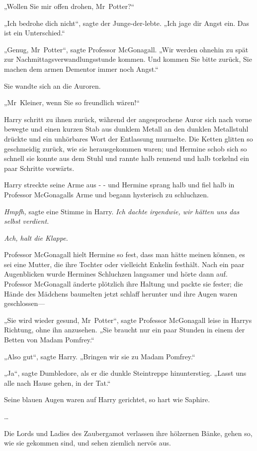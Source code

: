 {„Wollen Sie mir offen drohen, Mr~Potter?“

„Ich bedrohe dich nicht“, sagte der Junge-der-lebte. „Ich jage dir Angst ein. Das ist ein Unterschied.“

„Genug, Mr~Potter“, sagte Professor McGonagall. „Wir werden ohnehin zu spät zur Nachmittagsverwandlungsstunde kommen. Und kommen Sie bitte zurück, Sie machen dem armen Dementor immer noch Angst.“

Sie wandte sich an die Auroren.

„Mr~Kleiner, wenn Sie so freundlich wären!“

Harry schritt zu ihnen zurück, während der angesprochene Auror sich nach vorne bewegte und einen kurzen Stab aus dunklem Metall an den dunklen Metallstuhl drückte und ein unhörbares Wort der Entlassung murmelte. Die Ketten glitten so geschmeidig zurück, wie sie herausgekommen waren; und Hermine schob sich so schnell sie konnte aus dem Stuhl und rannte halb rennend und halb torkelnd ein paar Schritte vorwärts.

Harry streckte seine Arme aus - - und Hermine sprang halb und fiel halb in Professor McGonagalls Arme und begann hysterisch zu schluchzen.

\emph{Hmpfh,} sagte eine Stimme in Harry. \emph{Ich dachte irgendwie, wir hätten uns das selbst verdient.}

\emph{Ach, halt die Klappe.}

Professor McGonagall hielt Hermine so fest, dass man hätte meinen können, es sei eine Mutter, die ihre Tochter oder vielleicht Enkelin festhält. Nach ein paar Augenblicken wurde Hermines Schluchzen langsamer und hörte dann auf. Professor McGonagall änderte plötzlich ihre Haltung und packte sie fester; die Hände des Mädchens baumelten jetzt schlaff herunter und ihre Augen waren geschlossen—

„Sie wird wieder gesund, Mr~Potter“, sagte Professor McGonagall leise in Harrys Richtung, ohne ihn anzusehen. „Sie braucht nur ein paar Stunden in einem der Betten von Madam Pomfrey.“

„Also gut“, sagte Harry. „Bringen wir sie zu Madam Pomfrey.“

„Ja“, sagte Dumbledore, als er die dunkle Steintreppe hinunterstieg. „Lasst uns alle nach Hause gehen, in der Tat.“

Seine blauen Augen waren auf Harry gerichtet, so hart wie Saphire.

…

Die Lords und Ladies des Zaubergamot verlassen ihre hölzernen Bänke, gehen so, wie sie gekommen sind, und sehen ziemlich nervös aus.

}
